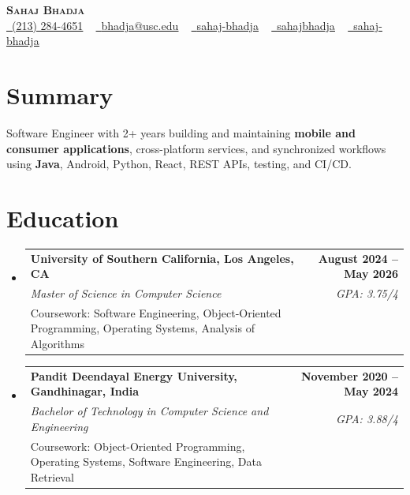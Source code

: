 \documentclass[letterpaper,10pt]{article}
\makeatletter
\newcommand{\sectionGap}{\vspace{-8pt}}
\newcommand{\resumeEduSubheading}[5]{\vspace{-1pt}\item\begin{tabular*}{1.0\textwidth}[t]{l@{\extracolsep{\fill}}r}\textbf{#1} & \textbf{\small #2} \\\textit{\small #3} & \textit{\small #4} \\\small #5 & \\\end{tabular*}\vspace{-4pt}}
\newcommand{\resumeSubHeadingListStart}{\begin{itemize}[leftmargin=0.0in, label={}]}
\newcommand{\resumeSubHeadingListEnd}{\end{itemize}}
\makeatother
\begin{document}
\begin{center}
{\Huge \scshape \textbf{Sahaj Bhadja}} \\ \vspace{1pt}
\small \href{tel:2132844651}{\faPhone\ \underline{(213) 284-4651}} ~ \href{mailto:bhadja@usc.edu}{\raisebox{-0.2\height}\faEnvelope\ \underline{bhadja@usc.edu}} ~
\href{https://www.linkedin.com/in/sahaj-bhadja/}{\raisebox{-0.2\height}\faLinkedin\ \underline{sahaj-bhadja}} ~ \href{https://github.com/SAHAJ-BHADJA}{\raisebox{-0.2\height}\faGithub\ \underline{sahajbhadja}} ~
\href{https://sahaj-bhadja.vercel.app/}{\raisebox{-0.2\height}\faGlobe\ \underline{sahaj-bhadja}}
\end{center}
\vspace{-16pt}
\section{Summary}
\begin{itemize}[leftmargin=0.15in, label={}]
\small{\item{Software Engineer with 2+ years building and maintaining \textbf{mobile and consumer applications}, cross-platform services, and synchronized workflows using \textbf{Java}, Android, Python, React, REST APIs, testing, and CI/CD.}}
\end{itemize}
\sectionGap
\section{Education}
\resumeSubHeadingListStart
\resumeEduSubheading{University of Southern California, Los Angeles, CA}{August 2024 -- May 2026}{Master of Science in Computer Science}{GPA: 3.75/4}{Coursework: Software Engineering, Object-Oriented Programming, Operating Systems, Analysis of Algorithms}
\resumeEduSubheading{Pandit Deendayal Energy University, Gandhinagar, India}{November 2020 -- May 2024}{Bachelor of Technology in Computer Science and Engineering}{GPA: 3.88/4}{Coursework: Object-Oriented Programming, Operating Systems, Software Engineering, Data Retrieval}
\resumeSubHeadingListEnd
\sectionGap
\end{document}
